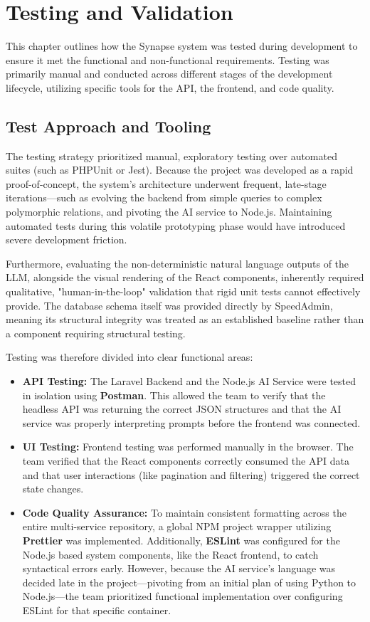 \section{Testing and Validation} \label{sec:validation}
This chapter outlines how the Synapse system was tested during development to ensure it met the functional and non-functional requirements. Testing was primarily manual and conducted across different stages of the development lifecycle, utilizing specific tools for the API, the frontend, and code quality.

\subsection{Test Approach and Tooling}
The testing strategy prioritized manual, exploratory testing over automated suites (such as PHPUnit or Jest). Because the project was developed as a rapid proof-of-concept, the system's architecture underwent frequent, late-stage iterations---such as evolving the backend from simple queries to complex polymorphic relations, and pivoting the AI service to Node.js. Maintaining automated tests during this volatile prototyping phase would have introduced severe development friction.

Furthermore, evaluating the non-deterministic natural language outputs of the LLM, alongside the visual rendering of the React components, inherently required qualitative, "human-in-the-loop" validation that rigid unit tests cannot effectively provide. The database schema itself was provided directly by SpeedAdmin, meaning its structural integrity was treated as an established baseline rather than a component requiring structural testing.

Testing was therefore divided into clear functional areas:
\begin{itemize}
    \item \textbf{API Testing:} The Laravel Backend and the Node.js AI Service were tested in isolation using \textbf{Postman}. This allowed the team to verify that the headless API was returning the correct JSON structures and that the AI service was properly interpreting prompts before the frontend was connected.
    \item \textbf{UI Testing:} Frontend testing was performed manually in the browser. The team verified that the React components correctly consumed the API data and that user interactions (like pagination and filtering) triggered the correct state changes.
    \item \textbf{Code Quality Assurance:} To maintain consistent formatting across the entire multi-service repository, a global NPM project wrapper utilizing \textbf{Prettier} was implemented. Additionally, \textbf{ESLint} was configured for the Node.js based system components, like the React frontend, to catch syntactical errors early. However, because the AI service's language was decided late in the project---pivoting from an initial plan of using Python to Node.js---the team prioritized functional implementation over configuring ESLint for that specific container.
\end{itemize}

